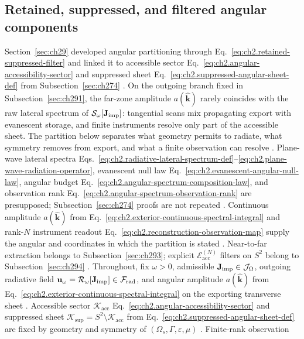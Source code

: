 \subsection{Retained, suppressed, and filtered angular components}
\label{sec:ch292}
Section~\ref{sec:ch29} developed angular partitioning through
Eq.~\eqref{eq:ch2.retained-suppressed-filter} and linked it to accessible sector
Eq.~\eqref{eq:ch2.angular-accessibility-sector} and suppressed sheet
Eq.~\eqref{eq:ch2.suppressed-angular-sheet-def} from Subsection~\ref{sec:ch274}
\cite{stratton1941}. On the outgoing branch fixed in Subsection~\ref{sec:ch291}, the far-zone amplitude
$a(\widehat{\mathbf{k}})$ rarely coincides with the raw lateral spectrum of
$\mathcal{S}_\omega[\mathbf{J}_{\mathrm{imp}}]$: tangential scans mix propagating export with evanescent storage, and
finite instruments resolve only part of the accessible sheet. The partition below separates what
geometry permits to radiate, what symmetry removes from export, and what a finite observation
can resolve \cite{hansen1988,stratton1941}.
\medskip
Plane-wave lateral spectra
Eqs.~\eqref{eq:ch2.radiative-lateral-spectrum-def}--\eqref{eq:ch2.plane-wave-radiation-operator},
evanescent null law Eq.~\eqref{eq:ch2.evanescent-angular-null-law}, angular budget
Eq.~\eqref{eq:ch2.angular-spectrum-composition-law}, and observation rank
Eq.~\eqref{eq:ch2.angular-spectrum-observation-rank} are presupposed; Subsection~\ref{sec:ch274}
proofs are not repeated \cite{stratton1941}. Continuous amplitude
\(a(\widehat{\mathbf{k}})\) from Eq.~\eqref{eq:ch2.exterior-continuous-spectral-integral} and
rank-$N$ instrument readout Eq.~\eqref{eq:ch2.reconstruction-observation-map} supply the angular and
coordinates in which the partition is stated \cite{stratton1941}.
Near-to-far extraction belongs to Subsection~\ref{sec:ch293}; explicit $\mathcal{E}_{\mathrm{acc}}^{(N)}$ filters on
\(S^{2}\) belong to Subsection~\ref{sec:ch294} \cite{stratton1941}. Throughout,
fix \(\omega>0\), admissible \(\mathbf{J}_{\mathrm{imp}}\in\mathcal{J}_\Omega\), outgoing radiative field
\(\mathbf{u}_\omega=\mathcal{R}_\omega[\mathbf{J}_{\mathrm{imp}}]\in\mathcal{F}_{\mathrm{rad}}\), and angular
amplitude \(a(\widehat{\mathbf{k}})\) from
Eq.~\eqref{eq:ch2.exterior-continuous-spectral-integral} on the exporting transverse sheet
\cite{stratton1941}. Accessible sector
\(\mathcal{K}_{\mathrm{acc}}\) Eq.~\eqref{eq:ch2.angular-accessibility-sector} and suppressed
sheet \(\mathcal{K}_{\mathrm{sup}}=S^{2}\setminus\mathcal{K}_{\mathrm{acc}}\) from
Eq.~\eqref{eq:ch2.suppressed-angular-sheet-def} are fixed by geometry and symmetry of
\((\Omega_s,\Gamma,\varepsilon,\mu)\) \cite{stratton1941}. Finite-rank observation
